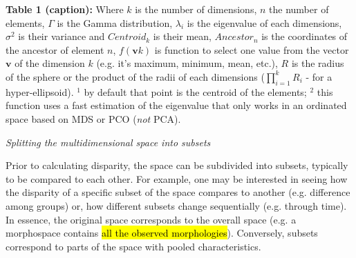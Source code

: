 \documentclass[12pt,letterpaper]{article}
\renewcommand{\subsection}[1]{%
\bigskip
\begin{center}
\begin{large}
\normalfont\itshape #1
\end{large}
\end{center}}
\begin{document}
\begin{table}
{\begin{tabular}{p{2cm}|p{5cm}|p{1cm}|p{5cm}|p{5cm}}
    \end{tabular}
}%
\end{table}

\textbf{Table 1 (caption):} Where $k$ is the number of dimensions, $n$ the number of elements, $\Gamma$ is the Gamma distribution, $\lambda_i$ is the eigenvalue of each dimensions, $\sigma^{2}$ is their variance and $Centroid_{k}$ is their mean, $Ancestor_{n}$ is the coordinates of the ancestor of element $n$, $f(\mathbf{v}k)$ is function to select one value from the vector $\mathbf{v}$ of the dimension $k$ (e.g. it's maximum, minimum, mean, etc.), $R$ is the radius of the sphere or the product of the radii of each dimensions ($\displaystyle\prod_{i=1}^{k}R_{i}$ - for a hyper-ellipsoid). $^1$ by default that point is the centroid of the elements; $^2$ this function uses a fast estimation of the eigenvalue that only works in an ordinated space based on MDS or PCO (\textit{not} PCA).
\label{Tab:metrics}


\subsection{Splitting the multidimensional space into subsets}
Prior to calculating disparity, the space can be subdivided into subsets, typically to be compared to each other.
For example, one may be interested in seeing how the disparity of a specific subset of the space compares to another (e.g. difference among groups) or, how different subsets change sequentially (e.g. through time).
In essence, the original space corresponds to the overall space (e.g. a morphospace contains \hl{all the observed morphologies}).
Conversely, subsets correspond to parts of the space with pooled characteristics.
\end{document}
